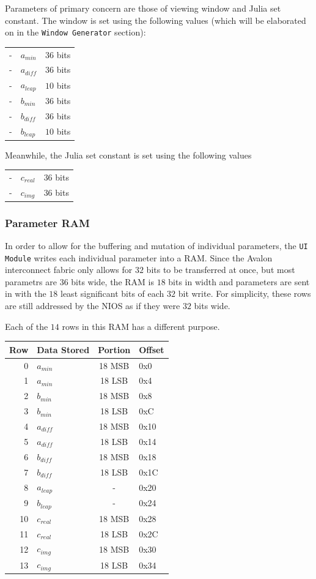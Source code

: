 \documentclass{article}
\begin{document}
Parameters of primary concern are those of viewing window and Julia set constant. The window is set using the 
following values (which will be elaborated on in the \texttt{Window Generator} section):

\begin{tabular}{rll}
-&$a_{min}$ & $36$ bits\\
-&$a_{diff}$ & $36$ bits\\
-&$a_{leap}$ & $10$ bits\\
-&$b_{min}$ & $36$ bits\\
-&$b_{diff}$ & $36$ bits\\
-&$b_{leap}$ & $10$ bits\\
\end{tabular}

Meanwhile, the Julia set constant is set using the following values

\begin{tabular}{rll}
-&$c_{real}$ & $36$ bits\\
-&$c_{img}$ & $36$ bits
\end{tabular}

\subsubsection{Parameter RAM}
In order to allow for the buffering and mutation of individual parameters, the \texttt{UI Module} writes each 
individual parameter into a RAM. Since the Avalon interconnect fabric only allows for $32$ bits to be transferred
at once, but most parametrs are $36$ bits wide, the RAM is $18$ bits in width and parameters are sent in with the
$18$ least significant bits of each $32$ bit write. For simplicity, these rows are still addressed by the 
NIOS as if they were $32$ bits wide.

Each of the $14$ rows in this RAM has a different purpose.

\begin{tabular}{rlcl}
\textbf{Row}&\textbf{Data Stored}&\textbf{Portion}&\textbf{Offset}\\ \hline
0&$a_{min}$ &18 MSB& 0x0\\
1&$a_{min}$ &18 LSB& 0x4\\
2&$b_{min}$ &18 MSB& 0x8\\
3&$b_{min}$ &18 LSB& 0xC\\
4&$a_{diff}$ &18 MSB& 0x10\\
5&$a_{diff}$ &18 LSB& 0x14\\
6&$b_{diff}$ &18 MSB& 0x18\\
7&$b_{diff}$ &18 LSB& 0x1C\\
8&$a_{leap}$ &-& 0x20\\
9&$b_{leap}$ &-& 0x24\\
10&$c_{real}$ &18 MSB& 0x28\\
11&$c_{real}$ &18 LSB& 0x2C\\
12&$c_{img}$ &18 MSB& 0x30\\
13&$c_{img}$ &18 LSB& 0x34\\
\end{tabular}
\end{document}

